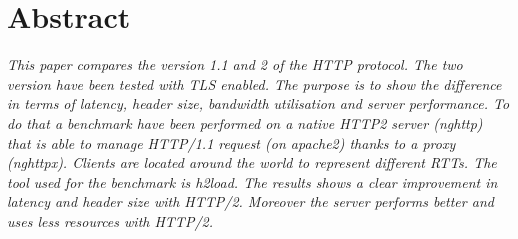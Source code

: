 \section*{Abstract}
\label{chap:intro}
\textit{This paper compares the version 1.1 and 2 of the HTTP protocol. The two version have been tested with TLS enabled. The purpose is to show the difference in terms of latency, header size, bandwidth utilisation and server performance. To do that a benchmark have been performed on a native HTTP2 server (nghttp) that is able to manage HTTP/1.1 request (on apache2) thanks to a proxy (nghttpx). Clients are located around the world to represent different RTTs. The tool used for the benchmark is h2load. The results shows a clear improvement in latency and header size with HTTP/2. Moreover the server performs better and uses less resources with HTTP/2.}